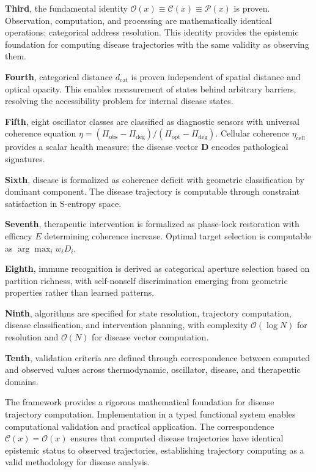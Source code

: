\documentclass[10pt,twocolumn]{article}
\theoremstyle{plain}
\theoremstyle{definition}
\theoremstyle{remark}
\newcommand{\dcat}{d_{\mathrm{cat}}}
\newcommand{\Obs}{\mathcal{O}}
\newcommand{\Comp}{\mathcal{C}}
\newcommand{\Proc}{\mathcal{P}}
\newcommand{\etacell}{\eta_{\mathrm{cell}}}
\newcommand{\Dvec}{\mathbf{D}}
\newcommand{\bigO}{\mathcal{O}}
\begin{document}
\textbf{Third}, the fundamental identity $\Obs(x) \equiv \Comp(x) \equiv \Proc(x)$ is proven. Observation, computation, and processing are mathematically identical operations: categorical address resolution. This identity provides the epistemic foundation for computing disease trajectories with the same validity as observing them.

\textbf{Fourth}, categorical distance $\dcat$ is proven independent of spatial distance and optical opacity. This enables measurement of states behind arbitrary barriers, resolving the accessibility problem for internal disease states.

\textbf{Fifth}, eight oscillator classes are classified as diagnostic sensors with universal coherence equation $\eta = (\Pi_{\mathrm{obs}} - \Pi_{\mathrm{deg}})/(\Pi_{\mathrm{opt}} - \Pi_{\mathrm{deg}})$. Cellular coherence $\etacell$ provides a scalar health measure; the disease vector $\Dvec$ encodes pathological signatures.

\textbf{Sixth}, disease is formalized as coherence deficit with geometric classification by dominant component. The disease trajectory is computable through constraint satisfaction in S-entropy space.

\textbf{Seventh}, therapeutic intervention is formalized as phase-lock restoration with efficacy $E$ determining coherence increase. Optimal target selection is computable as $\arg\max_i w_i D_i$.

\textbf{Eighth}, immune recognition is derived as categorical aperture selection based on partition richness, with self-nonself discrimination emerging from geometric properties rather than learned patterns.

\textbf{Ninth}, algorithms are specified for state resolution, trajectory computation, disease classification, and intervention planning, with complexity $\bigO(\log N)$ for resolution and $\bigO(N)$ for disease vector computation.

\textbf{Tenth}, validation criteria are defined through correspondence between computed and observed values across thermodynamic, oscillator, disease, and therapeutic domains.

The framework provides a rigorous mathematical foundation for disease trajectory computation. Implementation in a typed functional system enables computational validation and practical application. The correspondence $\Comp(x) = \Obs(x)$ ensures that computed disease trajectories have identical epistemic status to observed trajectories, establishing trajectory computing as a valid methodology for disease analysis.
\end{document}
